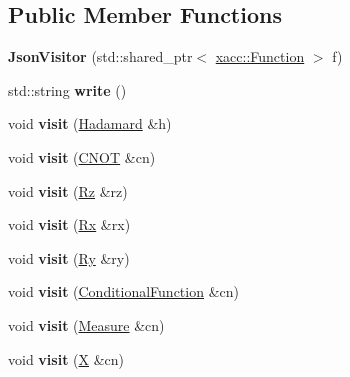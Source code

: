 \subsection*{Public Member Functions}
\begin{DoxyCompactItemize}
\item 
{\bfseries Json\+Visitor} (std\+::shared\+\_\+ptr$<$ \hyperlink{a00106}{xacc\+::\+Function} $>$ f)\hypertarget{a00188_a7b2bf70217828adf6457e3fee7e13056}{}\label{a00188_a7b2bf70217828adf6457e3fee7e13056}

\item 
std\+::string {\bfseries write} ()\hypertarget{a00188_a78e2b6c71755a0fed97de43e0b7edc82}{}\label{a00188_a78e2b6c71755a0fed97de43e0b7edc82}

\item 
void {\bfseries visit} (\hyperlink{a00137}{Hadamard} \&h)\hypertarget{a00188_afdebbabdbae5ecb3a508f02ffe056fd4}{}\label{a00188_afdebbabdbae5ecb3a508f02ffe056fd4}

\item 
void {\bfseries visit} (\hyperlink{a00058}{C\+N\+OT} \&cn)\hypertarget{a00188_a83c17c122c0e02242189b3564290f3e9}{}\label{a00188_a83c17c122c0e02242189b3564290f3e9}

\item 
void {\bfseries visit} (\hyperlink{a00258}{Rz} \&rz)\hypertarget{a00188_a76c3593f3933631c2dbca74b7b216534}{}\label{a00188_a76c3593f3933631c2dbca74b7b216534}

\item 
void {\bfseries visit} (\hyperlink{a00256}{Rx} \&rx)\hypertarget{a00188_ad73ac1911e894f315fcee802673a30da}{}\label{a00188_ad73ac1911e894f315fcee802673a30da}

\item 
void {\bfseries visit} (\hyperlink{a00257}{Ry} \&ry)\hypertarget{a00188_a0e744d9db4c2d16196b17f91a84f8767}{}\label{a00188_a0e744d9db4c2d16196b17f91a84f8767}

\item 
void {\bfseries visit} (\hyperlink{a00060}{Conditional\+Function} \&cn)\hypertarget{a00188_aea63f829d8c926e567ef6a09a0ca779e}{}\label{a00188_aea63f829d8c926e567ef6a09a0ca779e}

\item 
void {\bfseries visit} (\hyperlink{a00215}{Measure} \&cn)\hypertarget{a00188_a71a9c4b78152af3366f8ee93b2e4d9da}{}\label{a00188_a71a9c4b78152af3366f8ee93b2e4d9da}

\item 
void {\bfseries visit} (\hyperlink{a00336}{X} \&cn)\hypertarget{a00188_a2862d01b12da46374c16a3baf33bb4ca}{}\label{a00188_a2862d01b12da46374c16a3baf33bb4ca}


\end{DoxyCompactItemize}
